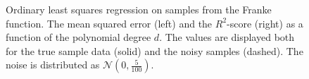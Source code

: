\documentclass[dvipsnames, article, a4paper, oneside, 12pt]{memoir}
\newcommand{\N}{\mathcal{N}}
\begin{document}
  \begin{figure}
    \centering
    \caption{Ordinary least squares regression on samples from the Franke
      function. The mean squared error (left) and the \(R^2\)-score (right) as
      a function of the polynomial degree \( d \). The values are displayed
      both for the true sample data (solid) and the noisy samples (dashed). The
      noise is distributed as \( \N(0, \tfrac{5}{100})\).}
    \label{fig:ols_scores}
  \end{figure}
\end{document}
